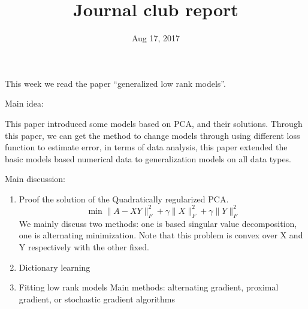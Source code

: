 \documentclass[UTF8]{article}
\begin{document}
	\title{Journal club report}	
	\date{Aug 17, 2017} 
	\maketitle
	This week we read the paper “generalized low rank models”.
	
	Main idea:
	
	This paper introduced some models based on PCA, and their solutions. Through this paper, we can get the method to change models through using different loss function to estimate error, in terms of data analysis, this paper extended the basic models based numerical data to generalization models on all data types.
	
	Main discussion:

	
	  
	\begin{enumerate}[1)]
		\item Proof the solution of the Quadratically regularized PCA.
		\begin{equation}
		\min \lVert A-XY \lVert_F^2+\gamma\lVert X\lVert_F^2+\gamma\lVert Y\lVert_F^2
		\end{equation}
		We mainly discuss two methods: one is based singular value decomposition, one is alternating minimization. 
		Note that this problem is convex over X and Y respectively with the other fixed.
		\item Dictionary learning
		\item Fitting low rank models
		Main methods:
		alternating gradient, proximal gradient, or stochastic gradient algorithms
     \end{enumerate}
\end{document}
